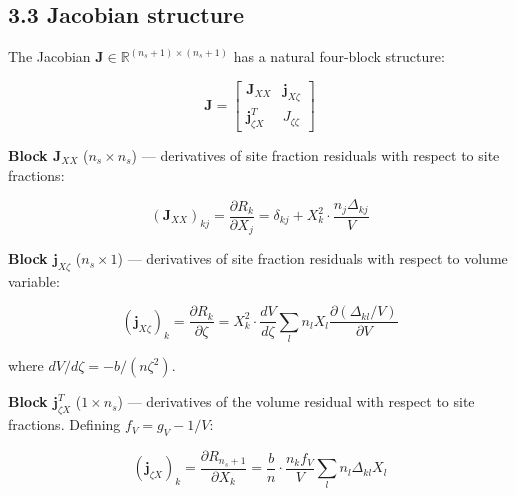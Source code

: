 \documentclass[review,3p]{elsarticle}
\begin{document}
\subsection{3.3 Jacobian structure}

The Jacobian $\mathbf{J} \in \mathbb{R}^{(n_s+1) \times (n_s+1)}$ has a natural four-block structure:

\begin{equation}

\mathbf{J} = \begin{bmatrix} \mathbf{J}_{XX} & \mathbf{j}_{X\zeta} \\ \mathbf{j}_{\zeta X}^T & J_{\zeta\zeta} \end{bmatrix}

\end{equation}

\textbf{Block $\mathbf{J}_{XX}$} ($n_s \times n_s$) — derivatives of site fraction residuals with respect to site fractions:

\begin{equation}

\left(\mathbf{J}_{XX}\right)_{kj} = \frac{\partial R_k}{\partial X_j} = \delta_{kj} + X_k^2 \cdot \frac{n_j \Delta_{kj}}{V}

\end{equation}

\textbf{Block $\mathbf{j}_{X\zeta}$} ($n_s \times 1$) — derivatives of site fraction residuals with respect to volume variable:

\begin{equation}

\left(\mathbf{j}_{X\zeta}\right)_k = \frac{\partial R_k}{\partial \zeta} = X_k^2 \cdot \frac{dV}{d\zeta} \sum_{l} n_l X_l \frac{\partial(\Delta_{kl}/V)}{\partial V}

\end{equation}

where $dV/d\zeta = -b/(n\zeta^2)$.

\textbf{Block $\mathbf{j}_{\zeta X}^T$} ($1 \times n_s$) — derivatives of the volume residual with respect to site fractions. Defining $f_V = g_V - 1/V$:

\begin{equation}

\left(\mathbf{j}_{\zeta X}\right)_k = \frac{\partial R_{n_s+1}}{\partial X_k} = \frac{b}{n} \cdot \frac{n_k f_V}{V} \sum_{l} n_l \Delta_{kl} X_l

\end{equation}
\end{document}
